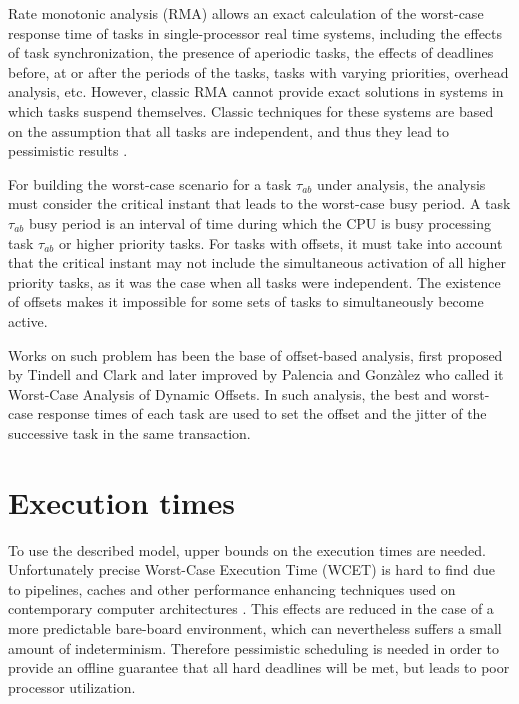 \documentclass{article}
\begin{document}
Rate monotonic analysis (RMA) \cite{rm-dm} allows an exact calculation of the worst-case response time of tasks in single-processor real time systems, including the effects of task synchronization, the presence of aperiodic tasks, the effects of deadlines before, at or after the periods of the tasks, tasks with varying priorities, overhead analysis, etc. However, classic RMA \cite{practitioner-common-data} cannot provide exact solutions in systems in which tasks suspend themselves. Classic techniques for these systems are based on the assumption that all tasks are independent, and thus they lead to pessimistic results \cite{pessimistic-rma}.

For building the worst-case scenario for a task $\tau_{ab}$ under analysis, the analysis must consider the critical instant that leads to the worst-case busy period. A task $\tau_{ab}$ busy period is an interval of time during which the CPU is busy processing task $\tau_{ab}$ or higher priority tasks. For tasks with offsets, it must take into account that the critical instant may not include the simultaneous activation of all higher priority tasks, as it was the case when all tasks were independent. The existence of offsets makes it impossible for some sets of tasks to simultaneously become active.

Works on such problem has been the base of offset-based analysis, first proposed by Tindell and Clark \cite{tindell-offsets} and later improved by Palencia and Gonzàlez \cite{pessimistic-rma} who called it Worst-Case Analysis of Dynamic Offsets. In such analysis, the best and worst-case response times of each task are used to set the offset and the jitter of the successive task in the same transaction.

\section{Execution times}

To use the described model, upper bounds on the execution times are needed. Unfortunately precise Worst-Case Execution Time (WCET) is hard to find due to pipelines, caches and other performance enhancing techniques used on contemporary computer architectures \cite{wcet-problem}. This effects are reduced in the case of a more predictable bare-board environment, which can nevertheless suffers a small amount of indeterminism. Therefore pessimistic scheduling is needed in order to provide an offline guarantee that all hard deadlines will be met, but leads to poor processor utilization.
\end{document}
